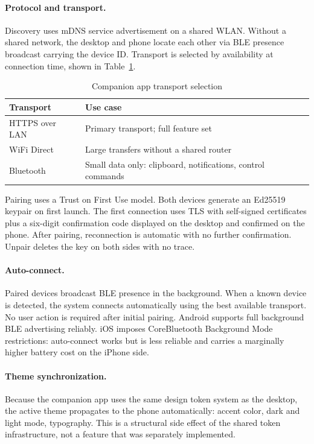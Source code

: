 \paragraph{Protocol and transport.}
Discovery uses mDNS service advertisement on a shared WLAN. Without a shared
network, the desktop and phone locate each other via BLE presence broadcast
carrying the device ID. Transport is selected by availability at connection
time, shown in Table~\ref{tab:companion-transport}.

\begin{table}[htbp]
\caption{Companion app transport selection}
\label{tab:companion-transport}
\begin{tabularx}{\linewidth}{lX}
\toprule
\textbf{Transport} & \textbf{Use case} \\
\midrule
HTTPS over LAN  & Primary transport; full feature set \\
WiFi Direct     & Large transfers without a shared router \\
Bluetooth       & Small data only: clipboard, notifications, control commands \\
\bottomrule
\end{tabularx}
\end{table}

Pairing uses a Trust on First Use model. Both devices generate an Ed25519
keypair on first launch. The first connection uses TLS with self-signed
certificates plus a six-digit confirmation code displayed on the desktop and
confirmed on the phone. After pairing, reconnection is automatic with no
further confirmation. Unpair deletes the key on both sides with no trace.

\paragraph{Auto-connect.}
Paired devices broadcast BLE presence in the background. When a known device
is detected, the system connects automatically using the best available
transport. No user action is required after initial pairing. Android supports
full background BLE advertising reliably. iOS imposes CoreBluetooth Background
Mode restrictions: auto-connect works but is less reliable and carries a
marginally higher battery cost on the iPhone side.

\paragraph{Theme synchronization.}
Because the companion app uses the same design token system as the desktop,
the active theme propagates to the phone automatically: accent color, dark and
light mode, typography. This is a structural side effect of the shared token
infrastructure, not a feature that was separately implemented.


